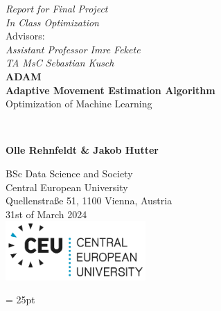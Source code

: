 \documentclass[journal]{IEEEtran}
\begin{document}
\begin{titlepage}
   \begin{center}
        \vfill
        \textit{Report for Final Project}\\
        \textit{In Class Optimization}\\
        \vspace{0.5cm}
        Advisors:\\
        \textit{Assistant Professor Imre Fekete}\\
        \textit{TA MsC Sebastian Kusch}
        \vfill\noindent\hrulefill \\
        \vspace*{1cm}
        \textbf{\huge ADAM}\\
        \vspace{0.2cm}
        \textbf{\huge Adaptive Movement Estimation Algorithm }
        \vspace{0.5cm}
        \\
        Optimization of Machine Learning
        
        \noindent\hrulefill \\

       
            
       \vspace{1.5cm}

       \textbf{Olle Rehnfeldt \& Jakob Hutter}

       \vfill
            
       
            
       \vspace{2cm}
       BSc Data Science and Society\\
       Central European University\\
       Quellenstraße 51, 1100 Vienna, Austria\\
       31st of March 2024\\
       \vspace{1.5cm}
       \includegraphics[width=0.4\textwidth]{figures/CEU_Logo_RGB_DualColor.png}
       
            
   \end{center}
\end{titlepage}

\pagestyle{fancy}
\headheight = 25pt
\fancyhf{}
\fancyfoot[C]{\thepage}
\newpage
\end{document}
